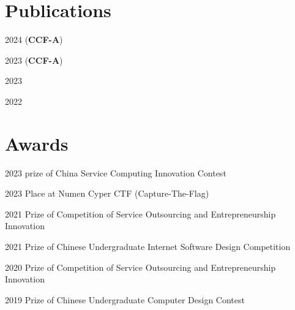 \documentclass[12pt,letterpaper]{report}
\begin{document}
    \section*{Publications}
    \begin{tablist}
        \item[2024] \tab{} (\textbf{CCF-A})
        \item[2023] \tab{} (\textbf{CCF-A})
        \item[2023] \tab{}
        \item[2022] \tab{}
    \end{tablist}


    \section*{Awards}
    \begin{tablist}
        \item[2023] \tab{} prize of China Service Computing Innovation Contest
        \item[2023] \tab{} Place at Numen Cyper CTF (Capture-The-Flag)
        \item[2021] \tab{} Prize of Competition of Service Outsourcing and Entrepreneurship Innovation
        \item[2021] \tab{} Prize of Chinese Undergraduate Internet Software Design Competition
        \item[2020] \tab{} Prize of Competition of Service Outsourcing and Entrepreneurship Innovation
        \item[2019] \tab{} Prize of Chinese Undergraduate Computer Design Contest
    \end{tablist}
\end{document}
